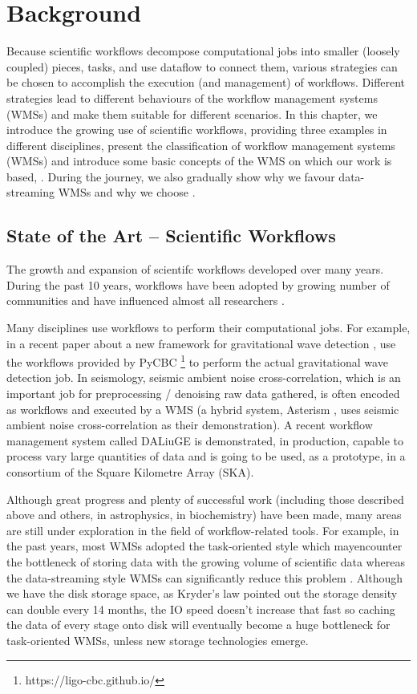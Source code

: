 \chapter{Background}
Because scientific workflows decompose computational jobs into smaller (loosely coupled) pieces, tasks, and use dataflow to connect them, various strategies can be chosen to accomplish the execution (and management) of workflows. Different strategies lead to different behaviours of the workflow management systems (WMSs) and make them suitable for different scenarios. In this chapter, we introduce the growing use of scientific workflows, providing three examples in different disciplines, present the classification of workflow management systems (WMSs) and introduce some basic concepts of the WMS on which our work is based, \dpy. During the journey, we also gradually show why we favour data-streaming WMSs and why we choose \dpy.

\section{State of the Art -- Scientific Workflows}
The growth and expansion of scientifc workflows developed over many years. During the past 10 years, workflows have been adopted by growing number of communities and have influenced almost all researchers \cite{ATKINSON2017216}.

Many disciplines use workflows to perform their computational jobs. For example, in a recent paper about a new framework for gravitational wave detection \cite{gwave}, \citeauthor{gwave} use the workflows provided by PyCBC \footnote{https://ligo-cbc.github.io/} to perform the actual gravitational wave detection job. In seismology, seismic ambient noise cross-correlation, which is an important job for preprocessing / denoising raw data gathered, is often encoded as workflows and executed by a WMS (\eg a hybrid system, Asterism \cite{Asterism}, uses seismic ambient noise cross-correlation as their demonstration). A recent workflow management system called DALiuGE \cite{wu2017daliuge} is demonstrated, in production, capable to process vary large quantities of data and is going to be used, as a prototype, in a consortium of the Square Kilometre Array (SKA).

Although great progress and plenty of successful work (including those described above and others, \eg \cite{berriman2007generating} \cite{berriman2010application} in astrophysics, \cite{aiche2015workflows} in biochemistry) have been made, many areas are still under exploration in the field of workflow-related tools. For example, in the past years, most WMSs adopted the task-oriented style which mayencounter the bottleneck of storing data with the growing volume of scientific data whereas the data-streaming style WMSs can significantly reduce this problem \cite{doi:10.1177/1094342016649766}. Although we have the disk storage space, as Kryder’s law \citep{Kryders_law} pointed out the storage density can double every 14 months, the IO speed doesn't increase that fast so caching the data of every stage onto disk will eventually become a huge bottleneck for task-oriented WMSs, unless new storage technologies emerge.

